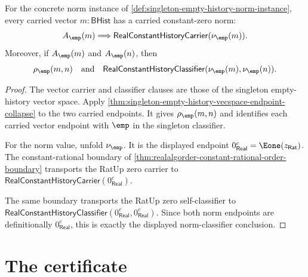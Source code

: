 \begin{theorem}
\label{thm:singleton-empty-history-norm-carrier-classifier}
For the concrete norm instance of
\autoref{def:singleton-empty-history-norm-instance}, every carried vector
$m:\mathsf{BHist}$ has a carried constant-zero norm:
$$
A_{\emp}(m)\Longrightarrow
\mathsf{RealConstantHistoryCarrier}(\nu_{\emp}(m)).
$$
Moreover, if $A_{\emp}(m)$ and $A_{\emp}(n)$, then
$$
\rho_{\emp}(m,n)
\quad\text{and}\quad
\mathsf{RealConstantHistoryClassifier}(\nu_{\emp}(m),\nu_{\emp}(n)).
$$
\end{theorem}
\begin{proof}
The vector carrier and classifier clauses are those of the singleton
empty-history vector space. Apply
\autoref{thm:singleton-empty-history-vecspace-endpoint-collapse} to the two
carried endpoints. It gives $\rho_{\emp}(m,n)$ and identifies each carried
vector endpoint with $\emp$ in the singleton classifier.

For the norm value, unfold $\nu_{\emp}$. It is the displayed endpoint
$0_{\mathsf{Real}}^{c}=\Eone(z_{\mathsf{Rat}})$. The constant-rational boundary of
\autoref{thm:realalgorder-constant-rational-order-boundary} transports the
RatUp zero carrier to
$\mathsf{RealConstantHistoryCarrier}(0_{\mathsf{Real}}^{c})$.

The same boundary transports the RatUp zero self-classifier to
$\mathsf{RealConstantHistoryClassifier}(0_{\mathsf{Real}}^{c},0_{\mathsf{Real}}^{c})$. Since
both norm endpoints are definitionally $0_{\mathsf{Real}}^{c}$, this is exactly the
displayed norm-classifier conclusion.
\end{proof}

\section{The certificate}
\label{sec:norm-certificate}

